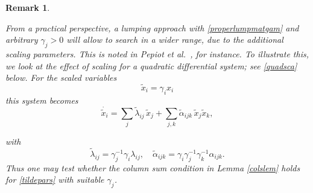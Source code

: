 \documentclass{article}
\newtheorem{remark}{Remark}
\begin{document}
\begin{remark}\label{scalerem} {\em 
    From a practical perspective, a lumping approach with \eqref{properlumpmatgam} and arbitrary $\gamma_j>0$ will allow to search in a wider range, due to the additional scaling parameters. This is noted in Pepiot et al.\ \cite{PCP2019}, for instance.
    To illustrate this, we look at the effect of scaling for a quadratic differential system; see \eqref{quadsca} below.
    For the scaled variables 
    \[
    \widetilde x_i=\gamma_ix_i
    \]
    this system becomes
     \begin{equation}\label{quadsca}
        \dot{\widetilde x_i}=\sum_j\widetilde \lambda_{ij}\,\widetilde x_j+\sum_{j,k} \widetilde \alpha_{ijk}\,\widetilde x_j\widetilde x_k,
    \end{equation}
    
    with 
    \begin{equation}\label{tildepars}
     \widetilde \lambda_{ij}=\gamma_j^{-1}\gamma_i \lambda_{ij},\quad \widetilde \alpha_{ijk} =\gamma_i\gamma_j^{-1}\gamma_k^{-1}\alpha_{ijk}.
    \end{equation}
    Thus one may test whether the column sum condition in Lemma \ref{colslem} holds for \eqref{tildepars} with suitable $\gamma_j$.}
\end{remark}


\end{document}
